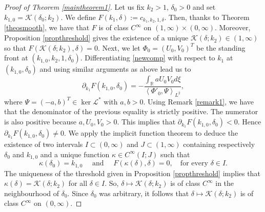 \documentclass[11pt]{article}
\numberwithin{equation}{section}
\newcommand{\1}{\mathbbm{1}}
\numberwithin{equation}{section}
\theoremstyle{definition}
\def \dis {\displaystyle}
\def \R {\mathbb{R}}
\def \L {\mathcal{L}}
\def \K {\mathcal{K}}
\numberwithin{equation}{section}
\def \dis {\displaystyle}
\begin{document}
\begin{proof}[Proof of Theorem \ref{maintheorem1}]
Let us fix $k_2>1$, $\delta_0>0$ and set $k_{1,0}=\K(\delta_0;k_2)$. We define $F(k_1,\delta):= c_{k_1,k_2,1,\delta}$. Then, thanks to Theorem \ref{theosmooth}, we have that $F$ is of class $C^\infty$ on $(1,\infty)\times (0,\infty)$. Moreover, Proposition \ref{propthreshold} gives the existence of a unique $\K(\delta;k_2) \in (1,\infty)$ so that $F(\K(\delta;k_2),\delta)=0$.  Next, we  let $\Phi_0=(U_0,V_0)^T$ be the standing front at $(k_{1,0},k_2,1,\delta_0)$.  Differentiating \eqref{newcomp} with respect to $k_1$ at $(k_{1,0},\delta_0)$ and using similar arguments as above lead us to
\begin{equation*}
\partial_{k_1}F(k_{1,0},\delta_0)
=-\frac{\dis\int_{\R} aU_0V_0d\xi}
{\left \langle \Phi'_0, \Psi\right\rangle_{L^2}},
\end{equation*}
where $\Psi=(-a,b)^T\in\operatorname{ker}\L^*$ with $a,b>0$. Using Remark \ref{remark1}, we have that the denominator of the previous equality is strictly positive. The numerator is also positive because $a, U_0,V_0>0$. This implies that $\partial_{k_1}F(k_{1,0},\delta_0)<0$. Hence $\partial_{k_1}F(k_{1,0},\delta_0)\neq 0$. We apply the implicit function theorem to deduce  the existence of two intervals $I\subset(0,\infty)$ and $J\subset(1,\infty)$ containing respectively $\delta_0$ and $k_{1,0}$ and a unique function $\kappa\in C^\infty(I;J)$ such that 
\begin{equation*}
\kappa(\delta_0)=k_{1,0} \quad \text{ and } \quad  F(\kappa(\delta),\delta)=0, \quad\text{for every }\delta\in I.
\end{equation*}
The uniqueness of the threshold given in Proposition \ref{propthreshold} implies that  $\kappa(\delta)=\K(\delta;k_2)$ for all $\delta\in I$. So, $\delta \mapsto \K(\delta;k_2)$ is of class $C^\infty$ in the neighbourhood of $\delta_0$. Since $\delta_0$ was arbitrary, it follows that $\delta \mapsto \K(\delta;k_2)$ is of class $C^\infty$ on $(0,\infty)$.


\end{proof}
\end{document}
